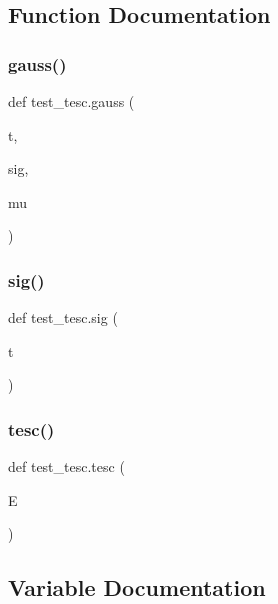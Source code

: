 \subsection{Function Documentation}
\mbox{\label{namespacetest__tesc_a0968ff3ab48ec4f84456c4a4defd46ba}} 
\subsubsection{\texorpdfstring{gauss()}{gauss()}}
{\footnotesize\ttfamily def test\+\_\+tesc.\+gauss (\begin{DoxyParamCaption}\item[{}]{t,  }\item[{}]{sig,  }\item[{}]{mu }\end{DoxyParamCaption})}

\mbox{\label{namespacetest__tesc_a77fe1535a7d04fa713375dbe232c86bf}} 
\subsubsection{\texorpdfstring{sig()}{sig()}}
{\footnotesize\ttfamily def test\+\_\+tesc.\+sig (\begin{DoxyParamCaption}\item[{}]{t }\end{DoxyParamCaption})}

\mbox{\label{namespacetest__tesc_a7a2918b5a3c859fd91fbc148ff9025d4}} 
\subsubsection{\texorpdfstring{tesc()}{tesc()}}
{\footnotesize\ttfamily def test\+\_\+tesc.\+tesc (\begin{DoxyParamCaption}\item[{}]{E }\end{DoxyParamCaption})}



\subsection{Variable Documentation}
\mbox{\label{namespacetest__tesc_aa4b79564062ea1ec889042f5aa63de49}} 
